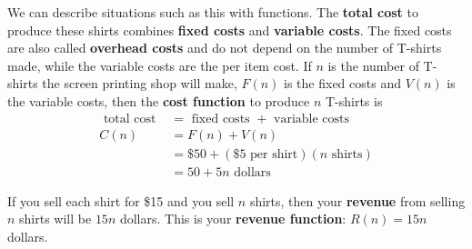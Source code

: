 We can describe situations such as this with functions. The {\bf total cost} to produce these shirts combines {\bf fixed costs} and {\bf variable costs}. The fixed costs are also called {\bf overhead costs} and do not depend on the number of T-shirts made, while the variable costs are the per item cost. If $n$ is the number of T-shirts the screen printing shop will make, $F(n)$ is the fixed costs and $V(n)$ is the variable costs, then the {\bf cost function} to produce $n$ T-shirts is
\begin{align*}
\mbox{ total cost } &= \mbox{ fixed costs } + \mbox{ variable costs}\\
C(n) &= F(n) + V(n)\\
&= \$50 + \left(\$5\mbox{ per shirt}\right)\left(n\mbox{ shirts}\right)\\
&= 50 + 5n \mbox{ dollars}
\end{align*}

If you sell each shirt for \$15 and you sell $n$ shirts, then your {\bf revenue} from selling $n$ shirts will be $15n$ dollars. This is your {\bf revenue function}: $R(n)=15n$ dollars.


